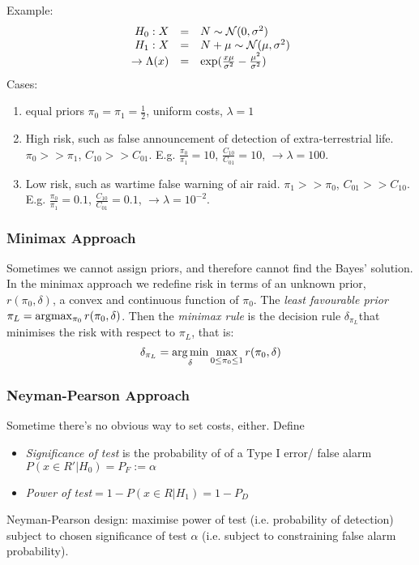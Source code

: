 Example:
\begin{equation}
\begin{array}{rcl}
H_0: X &=& N \sim \mathcal{N}(0,\sigma^2) \\
H_1: X &=& N + \mu \sim \mathcal{N}(\mu,\sigma^2)\\
\rightarrow \Lambda(x) &=& \exp(\frac{x \mu}{\sigma^2} - \frac{\mu^2}{\sigma^2})
\end{array}
\end{equation}
Cases:
\begin{enumerate}
\item equal priors $\pi_0 = \pi_1 =\frac{1}{2}$, uniform costs, $\lambda=1$
\item High risk, such as false announcement of detection of extra-terrestrial life. $\pi_0 >> \pi_1$, $C_{10}>>C_{01}$. E.g. $\frac{\pi_0}{\pi_1}=10$, $\frac{C_{10}}{C_{01}}=10$, $\rightarrow \lambda = 100$. 
\item Low risk, such as wartime false warning of air raid. $\pi_1 >> \pi_0$, $C_{01}>>C_{10}$. E.g. $\frac{\pi_0}{\pi_1}=0.1$, $\frac{C_{10}}{C_{01}}=0.1$, $\rightarrow \lambda = 10^{-2}$. 
\end{enumerate}

\subsubsection{Minimax Approach}
Sometimes we cannot assign priors, and therefore cannot find the Bayes' solution. In the minimax approach we redefine risk in terms of an unknown prior, $r(\pi_0, \delta)$, a convex and continuous function of $\pi_0$. The \textit{least favourable prior} $\pi_L = \arg\!\max_{\pi_0} r(\pi_0,\delta)$. Then the \textit{minimax rule} is the decision rule $\delta_{\pi_L}$that minimises the risk with respect to $\pi_L$, that is:
\begin{equation}
\label{eq:minimaxRule}
\delta_{\pi_L}=\operatorname*{arg\,min}_{\delta} \max_{0\leq \pi_0 \leq 1} r(\pi_0, \delta)
\end{equation}

\subsubsection{Neyman-Pearson Approach}
Sometime there's no obvious way to set costs, either. Define
\begin{itemize}
\item \textit{Significance of test} is the probability of of a Type I error/ false alarm $P(x\in R'|H_0)=P_F:=\alpha$
\item \textit{Power of test}$=1-P(x\in R|H_1)=1-P_D$
\end{itemize}
Neyman-Pearson design: maximise power of test (i.e. probability of detection) subject to chosen significance of test $\alpha$ (i.e. subject to constraining false alarm probability). 

